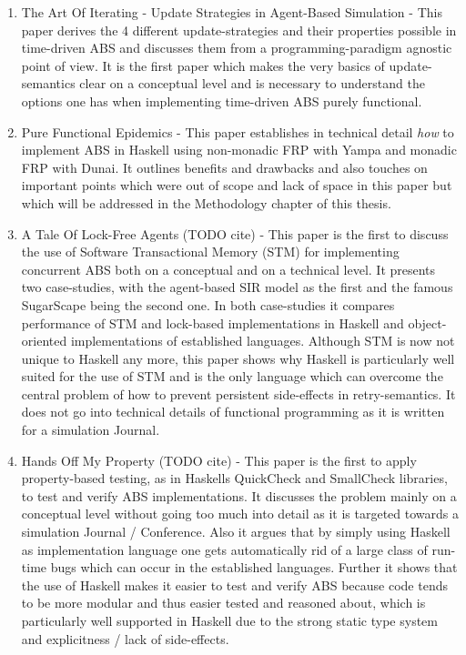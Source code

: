\begin{enumerate}
	\item The Art Of Iterating - Update Strategies in Agent-Based Simulation \cite{thaler_art_2017} - This paper derives the 4 different update-strategies and their properties possible in time-driven ABS and discusses them from a programming-paradigm agnostic point of view. It is the first paper which makes the very basics of update-semantics clear on a conceptual level and is necessary to understand the options one has when implementing time-driven ABS purely functional.
	
	\item Pure Functional Epidemics \cite{thaler_pure_2019} - This paper establishes in technical detail \textit{how} to implement ABS in Haskell using non-monadic FRP with Yampa and monadic FRP with Dunai. It outlines benefits and drawbacks and also touches on important points which were out of scope and lack of space in this paper but which will be addressed in the Methodology chapter of this thesis.
	
	\item A Tale Of Lock-Free Agents (TODO cite) - This paper is the first to discuss the use of Software Transactional Memory (STM) for implementing concurrent ABS both on a conceptual and on a technical level. It presents two case-studies, with the agent-based SIR model as the first and the famous SugarScape being the second one. In both case-studies it compares performance of STM and lock-based implementations in Haskell and object-oriented implementations of established languages. Although STM is now not unique to Haskell any more, this paper shows why Haskell is particularly well suited for the use of STM and is the only language which can overcome the central problem of how to prevent persistent side-effects in retry-semantics. It does not go into technical details of functional programming as it is written for a simulation Journal.

	\item Hands Off My Property (TODO cite) - This paper is the first to apply property-based testing, as in Haskells QuickCheck and SmallCheck libraries, to test and verify ABS implementations. It discusses the problem mainly on a conceptual level without going too much into detail as it is targeted towards a simulation Journal / Conference. Also it argues that by simply using Haskell as implementation language one gets automatically rid of a large class of run-time bugs which can occur in the established languages. Further it shows that the use of Haskell makes it easier to test and verify ABS because code tends to be more modular and thus easier tested and reasoned about, which is particularly well supported in Haskell due to the strong static type system and explicitness / lack of side-effects.
\end{enumerate}

